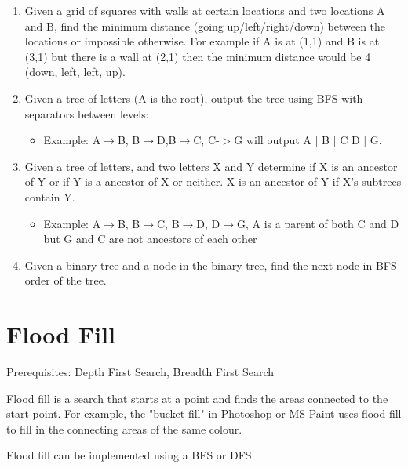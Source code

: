 \documentclass[11pt,oneside]{book}
\begin{document}
\begin{enumerate}
\item Given a grid of squares with walls at certain locations and two locations A and B, find the minimum distance (going up/left/right/down) between the locations or impossible otherwise. For example if A is at (1,1) and B is at (3,1) but there is a wall at (2,1) then the minimum distance would be 4 (down, left, left, up). 
\item Given a tree of letters (A is the root), output the tree using BFS with separators between levels:

\begin{itemize}
\item Example: A$\to$B, B$\to$D,B$\to$C, C-$>$G will output A | B | C D | G.
\end{itemize}
\item Given a tree of letters, and two letters X and Y determine if X is an ancestor of Y or if Y is a ancestor of X or neither. X is an ancestor of Y if X's subtrees contain Y.

\begin{itemize}
\item Example: A$\to$B, B$\to$C, B$\to$D, D$\to$G,  A is a parent of both C and D but G and C are not ancestors of each other
\end{itemize}
\item Given a binary tree and a node in the binary tree, find the next node in BFS order of the tree.
\end{enumerate}

        \section{ Flood Fill }
        

Prerequisites: Depth First Search, Breadth First Search

Flood fill is a search that starts at a point and finds the areas connected to the start point. For example, the "bucket fill" in Photoshop or MS Paint uses flood fill to fill in the connecting areas of the same colour.

Flood fill can be implemented using a BFS or DFS.
\end{document}
